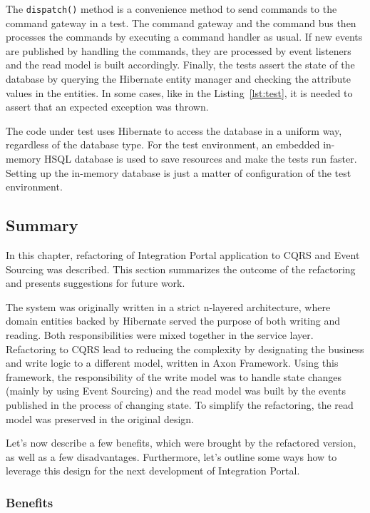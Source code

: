 \documentclass{book}
\begin{document}
The \texttt{dispatch()} method is a convenience method to send commands
to the command gateway in a test. The command gateway and the command
bus then processes the commands by executing a command handler as usual.
If new events are published by handling the commands, they are processed
by event listeners and the read model is built accordingly. Finally, the
tests assert the state of the database by querying the Hibernate entity
manager and checking the attribute values in the entities. In some
cases, like in the Listing~\ref{lst:test}, it is needed to assert that an
expected exception was thrown.

The code under test uses Hibernate to access the database in a uniform
way, regardless of the database type. For the test environment, an
embedded in-memory HSQL database is used to save resources and make the
tests run faster. Setting up the in-memory database is just a matter of
configuration of the test environment.


\subsection{Summary}\label{summary}

In this chapter, refactoring of Integration Portal application to CQRS
and Event Sourcing was described. This section summarizes the outcome of
the refactoring and presents suggestions for future work.

The system was originally written in a strict n-layered architecture,
where domain entities backed by Hibernate served the purpose of both
writing and reading. Both responsibilities were mixed together in the
service layer. Refactoring to CQRS lead to reducing the complexity by
designating the business and write logic to a different model, written
in Axon Framework. Using this framework, the responsibility of the write
model was to handle state changes (mainly by using Event Sourcing) and
the read model was built by the events published in the process of
changing state. To simplify the refactoring, the read model was
preserved in the original design.

Let's now describe a few benefits, which were brought by the refactored
version, as well as a few disadvantages. Furthermore, let's outline some
ways how to leverage this design for the next development of Integration
Portal.

\subsubsection{Benefits}\label{benefits}
\end{document}
